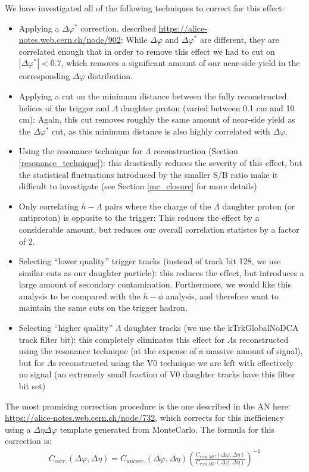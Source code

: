 \documentclass[ALICE,manyauthors]{ALICE_analysis_notes}
\begin{document}
We have investigated all of the following techniques to correct for this effect:
\begin{itemize}
\item Applying a $\Delta\varphi^{*}$ correction, described \href{here}{https://alice-notes.web.cern.ch/node/902}: While $\Delta\varphi$ and $\Delta\varphi^{*}$ are different, they are correlated enough that in order to remove this effect we had to cut on $|\Delta\varphi^{*}| < 0.7$, which removes a significant amount of our near-side yield in the corresponding $\Delta\varphi$ distribution.
\item Applying a cut on the minimum distance between the fully reconstructed helices of the trigger and $\Lambda$ daughter proton (varied between 0.1 cm and 10 cm): Again, this cut removes roughly the same amount of near-side yield as the $\Delta\varphi^{*}$ cut, as this minimum distance is also highly correlated with $\Delta\varphi$.
\item Using the resonance technique for $\Lambda$ reconstruction (Section \ref{resonance_technique}): this drastically reduces the severity of this effect, but the statistical fluctuations introduced by the smaller S/B ratio make it difficult to investigate (see Section \ref{mc_closure} for more details)
\item Only correlating $h-\Lambda$ pairs where the charge of the $\Lambda$ daughter proton (or antiproton) is opposite to the trigger: This reduces the effect by a considerable amount, but reduces our overall correlation statistcs by a factor of 2.
\item Selecting ``lower quality'' trigger tracks (instead of track bit 128, we use similar cuts as our daughter particle): this reduces the effect, but introduces a large amount of secondary contamination. Furthermore, we would like this analysis to be compared with the $h-\phi$ analysis, and therefore want to maintain the same cuts on the trigger hadron.
\item Selecting ``higher quality''  $\Lambda$ daughter tracks (we use the kTrkGlobalNoDCA track filter bit): this completely eliminates this effect for $\Lambda$s reconstructed using the resonance technique (at the expense of a massive amount of signal), but for $\Lambda$s reconstructed using the V0 technique we are left with effectively no signal (an extremely small fraction of V0 daughter tracks have this filter bit set)
\end{itemize}

The most promising correction procedure is the one described in the AN here: \url{https://alice-notes.web.cern.ch/node/732}, which corrects for this inefficiency using a $\Delta\eta\Delta\varphi$ template generated from MonteCarlo. The formula for this correction is:
\begin{align*}
	C_{corr.}(\Delta\varphi, \Delta\eta) = C_{uncorr.}(\Delta\varphi, \Delta\eta)(\frac{C_{reco. MC}(\Delta\varphi, \Delta\eta)}{C_{real. MC}(\Delta\varphi, \Delta\eta)})^{-1}
\end{align*}
\end{document}

